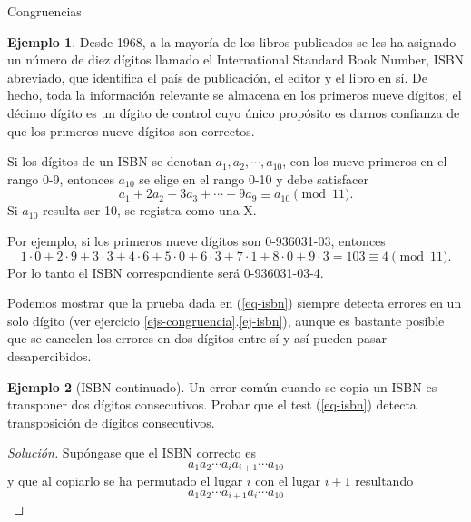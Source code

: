 \documentclass[11pt,spanish,makeidx]{amsbook}
\theoremstyle{definition}
\newtheorem{ejemplo}{Ejemplo}[section]
\theoremstyle{remark}
\begin{document}
\begin{section}{Congruencias}
\begin{ejemplo} Desde 1968, a la mayoría de los libros publicados se les ha asignado un número de diez dígitos llamado el International Standard Book Number, ISBN abreviado, que identifica el país de publicación, el editor y el libro en sí. De hecho, toda la información relevante se almacena en los primeros nueve dígitos; el décimo dígito es un dígito de control cuyo único propósito es darnos confianza de que los primeros nueve dígitos son correctos.
	
Si los dígitos de un ISBN se denotan $a_1, a_2,\cdots , a_{10}$, con los nueve primeros en el rango 0-9, entonces $a_{10}$ se elige en el rango 0-10 y debe satisfacer
\begin{equation}\label{eq-isbn}
	a_1 + 2a_2 + 3a_3 + \cdots + 9a_9  \equiv a_{10} \pmod{11}.
\end{equation}	
Si $a_{10}$ resulta ser 10, se registra como una X.  
	
Por ejemplo, si los primeros nueve dígitos son 0-936031-03, entonces
\begin{equation*}
	1 \cdot 0 + 2 \cdot 9 + 3 \cdot 3 + 4 \cdot 6 + 5 \cdot 0 + 6 \cdot 3 + 7 \cdot 1 + 8 \cdot 0 + 9 \cdot 3  =  103 \equiv 4 \pmod{11}.
\end{equation*}	
Por  lo tanto  el ISBN correspondiente será 0-936031-03-4.	

Podemos mostrar que la prueba dada en (\ref{eq-isbn}) siempre detecta errores en un solo dígito
(ver ejercicio \ref{ejs-congruencia}.\ref{ej-isbn}), aunque es bastante posible que se cancelen los errores en dos dígitos entre sí y así pueden pasar desapercibidos.

\end{ejemplo}

\begin{ejemplo}[ISBN continuado] Un error común cuando se copia un ISBN es transponer dos dígitos consecutivos. Probar que el test  (\ref{eq-isbn}) detecta transposición de dígitos consecutivos.
	\begin{proof}[Solución] 
	Supóngase que el ISBN correcto es 
	\begin{equation}\label{eq-isbn-coor}
		a_1 a_2\cdots a_{i}a_{i+1} \cdots a_{10}
	\end{equation}
	y que al copiarlo se ha permutado el lugar $i$ con el lugar $i+1$ resultando 
	\begin{equation}\label{eq-isbn-incoor}
		a_1 a_2\cdots a_{i+1}a_{i} \cdots a_{10}
	\end{equation}
	

\end{proof}
\end{ejemplo}
\end{section}
\end{document}
